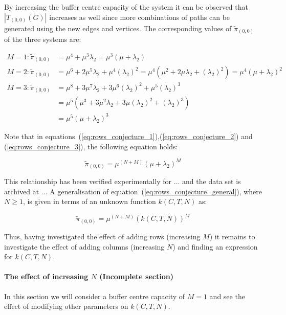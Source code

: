 By increasing the buffer centre capacity of the system it can be observed that 
\(|T_{(0,0)}(G)|\) increases as well since more combinations of paths can be 
generated using the new edges and vertices. 
The corresponding values of \(\tilde{\pi}_{(0,0)}\) of the three systems are:

\begin{align}
    M = 1: \tilde{\pi}_{(0,0)} &= \mu^4 + \mu^3 \lambda_2 = 
    \mu^3 (\mu + \lambda_2) \label{eq:rows_conjecture_1}\\
    M = 2: \tilde{\pi}_{(0,0)} &= \mu^6 + 2\mu^5 \lambda_2 + \mu^4 (\lambda_2)^2 
    = \mu^4(\mu^2 + 2\mu \lambda_2 + (\lambda_2)^2) 
    = \mu^4 (\mu + \lambda_2) ^ 2 \label{eq:rows_conjecture_2}\\
    M = 3: \tilde{\pi}_{(0,0)} &= \mu^8 + 3 \mu^7 \lambda_2 + 
    3 \mu^6 (\lambda_2)^2 + \mu^5(\lambda_2)^3 \nonumber \\
    &= \mu^5 (\mu^3 + 3 \mu ^2 \lambda_2 + 3 \mu (\lambda_2)^2 + (\lambda_2)^3) 
    \nonumber \\
    &= \mu^5 (\mu + \lambda_2) ^ 3 \label{eq:rows_conjecture_3}
\end{align}

Note that in equations~(\ref{eq:rows_conjecture_1}),(\ref{eq:rows_conjecture_2}) 
and (\ref{eq:rows_conjecture_3}), the following equation holds: 

\begin{equation}\label{eq:rows_conjecture_general}
    \tilde{\pi}_{(0,0)} = \mu^{(N+M)} (\mu + \lambda_2)^M
\end{equation}

This relationship has been verified experimentally for ... and the data set is 
archived at ... 
A generalisation of equation~(\ref{eq:rows_conjecture_general}), where \(N \geq
1\), is given in terms of an unknown function \(k(C,T,N)\) as:

\begin{equation}
    \tilde{\pi}_{(0,0)} = \mu^{(N+M)} (k(C,T,N))^M
\end{equation}

Thus, having investigated the effect of adding rows (increasing \(M\)) it remains 
to investigate the effect of adding columns (increasing \(N\)) and finding an 
expression for \(k(C,T,N)\).

\paragraph{The effect of increasing \(N\) (Incomplete section)}
In this section we will consider a buffer centre capacity of \(M=1\) and see the 
effect 
of modifying other parameters on \(k(C, T, N)\).


